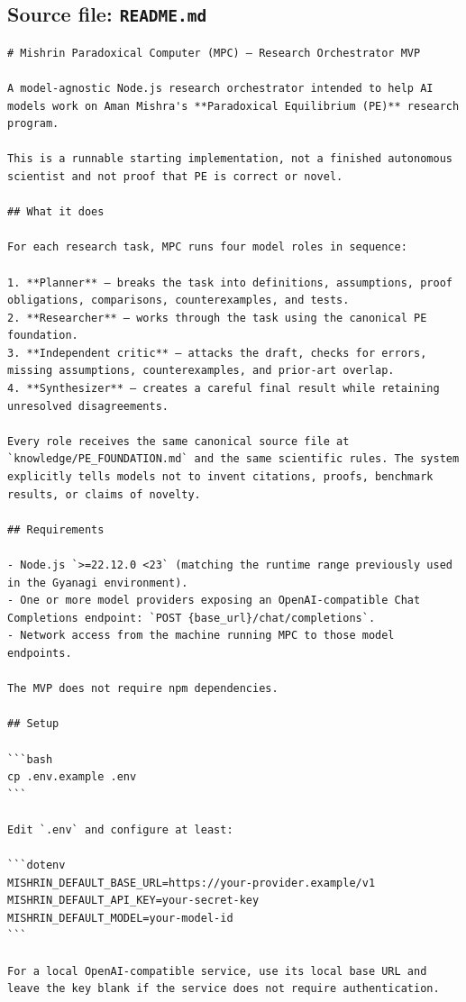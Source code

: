 \documentclass[10pt,a4paper]{article}
\begin{document}
\subsection{Source file: \texttt{README.md}}
\begin{lstlisting}
# Mishrin Paradoxical Computer (MPC) — Research Orchestrator MVP

A model-agnostic Node.js research orchestrator intended to help AI models work on Aman Mishra's **Paradoxical Equilibrium (PE)** research program.

This is a runnable starting implementation, not a finished autonomous scientist and not proof that PE is correct or novel.

## What it does

For each research task, MPC runs four model roles in sequence:

1. **Planner** — breaks the task into definitions, assumptions, proof obligations, comparisons, counterexamples, and tests.
2. **Researcher** — works through the task using the canonical PE foundation.
3. **Independent critic** — attacks the draft, checks for errors, missing assumptions, counterexamples, and prior-art overlap.
4. **Synthesizer** — creates a careful final result while retaining unresolved disagreements.

Every role receives the same canonical source file at `knowledge/PE_FOUNDATION.md` and the same scientific rules. The system explicitly tells models not to invent citations, proofs, benchmark results, or claims of novelty.

## Requirements

- Node.js `>=22.12.0 <23` (matching the runtime range previously used in the Gyanagi environment).
- One or more model providers exposing an OpenAI-compatible Chat Completions endpoint: `POST {base_url}/chat/completions`.
- Network access from the machine running MPC to those model endpoints.

The MVP does not require npm dependencies.

## Setup

```bash
cp .env.example .env
```

Edit `.env` and configure at least:

```dotenv
MISHRIN_DEFAULT_BASE_URL=https://your-provider.example/v1
MISHRIN_DEFAULT_API_KEY=your-secret-key
MISHRIN_DEFAULT_MODEL=your-model-id
```

For a local OpenAI-compatible service, use its local base URL and leave the key blank if the service does not require authentication.


\end{lstlisting}
\end{document}

